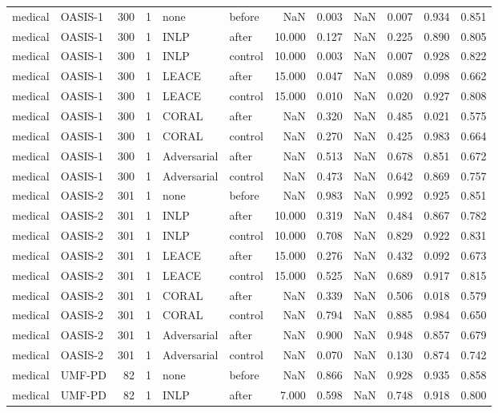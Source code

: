 \begin{tabular}{llrrllrrrrrr}
medical & OASIS-1 & 300 & 1 & none & before & NaN & 0.003 & NaN & 0.007 & 0.934 & 0.851 \\
medical & OASIS-1 & 300 & 1 & INLP & after & 10.000 & 0.127 & NaN & 0.225 & 0.890 & 0.805 \\
medical & OASIS-1 & 300 & 1 & INLP & control & 10.000 & 0.003 & NaN & 0.007 & 0.928 & 0.822 \\
medical & OASIS-1 & 300 & 1 & LEACE & after & 15.000 & 0.047 & NaN & 0.089 & 0.098 & 0.662 \\
medical & OASIS-1 & 300 & 1 & LEACE & control & 15.000 & 0.010 & NaN & 0.020 & 0.927 & 0.808 \\
medical & OASIS-1 & 300 & 1 & CORAL & after & NaN & 0.320 & NaN & 0.485 & 0.021 & 0.575 \\
medical & OASIS-1 & 300 & 1 & CORAL & control & NaN & 0.270 & NaN & 0.425 & 0.983 & 0.664 \\
medical & OASIS-1 & 300 & 1 & Adversarial & after & NaN & 0.513 & NaN & 0.678 & 0.851 & 0.672 \\
medical & OASIS-1 & 300 & 1 & Adversarial & control & NaN & 0.473 & NaN & 0.642 & 0.869 & 0.757 \\
medical & OASIS-2 & 301 & 1 & none & before & NaN & 0.983 & NaN & 0.992 & 0.925 & 0.851 \\
medical & OASIS-2 & 301 & 1 & INLP & after & 10.000 & 0.319 & NaN & 0.484 & 0.867 & 0.782 \\
medical & OASIS-2 & 301 & 1 & INLP & control & 10.000 & 0.708 & NaN & 0.829 & 0.922 & 0.831 \\
medical & OASIS-2 & 301 & 1 & LEACE & after & 15.000 & 0.276 & NaN & 0.432 & 0.092 & 0.673 \\
medical & OASIS-2 & 301 & 1 & LEACE & control & 15.000 & 0.525 & NaN & 0.689 & 0.917 & 0.815 \\
medical & OASIS-2 & 301 & 1 & CORAL & after & NaN & 0.339 & NaN & 0.506 & 0.018 & 0.579 \\
medical & OASIS-2 & 301 & 1 & CORAL & control & NaN & 0.794 & NaN & 0.885 & 0.984 & 0.650 \\
medical & OASIS-2 & 301 & 1 & Adversarial & after & NaN & 0.900 & NaN & 0.948 & 0.857 & 0.679 \\
medical & OASIS-2 & 301 & 1 & Adversarial & control & NaN & 0.070 & NaN & 0.130 & 0.874 & 0.742 \\
medical & UMF-PD & 82 & 1 & none & before & NaN & 0.866 & NaN & 0.928 & 0.935 & 0.858 \\
medical & UMF-PD & 82 & 1 & INLP & after & 7.000 & 0.598 & NaN & 0.748 & 0.918 & 0.800 \\

\end{tabular}
